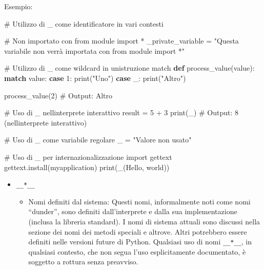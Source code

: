 \documentclass[
  letterpaper,
]{scrbook}
\newenvironment{Shaded}{\begin{snugshade}}{\end{snugshade}}
\newcommand{\BuiltInTok}[1]{\textcolor[rgb]{0.00,0.23,0.31}{#1}}
\newcommand{\CommentTok}[1]{\textcolor[rgb]{0.37,0.37,0.37}{#1}}
\newcommand{\ControlFlowTok}[1]{\textcolor[rgb]{0.00,0.23,0.31}{\textbf{#1}}}
\newcommand{\DecValTok}[1]{\textcolor[rgb]{0.68,0.00,0.00}{#1}}
\newcommand{\ImportTok}[1]{\textcolor[rgb]{0.00,0.46,0.62}{#1}}
\newcommand{\KeywordTok}[1]{\textcolor[rgb]{0.00,0.23,0.31}{\textbf{#1}}}
\newcommand{\NormalTok}[1]{\textcolor[rgb]{0.00,0.23,0.31}{#1}}
\newcommand{\OperatorTok}[1]{\textcolor[rgb]{0.37,0.37,0.37}{#1}}
\newcommand{\StringTok}[1]{\textcolor[rgb]{0.13,0.47,0.30}{#1}}
\providecommand{\tightlist}{%
  \setlength{\itemsep}{0pt}\setlength{\parskip}{0pt}}\usepackage{longtable,booktabs,array}
\begin{document}
Esempio:

\begin{Shaded}
\begin{Highlighting}[]
\CommentTok{\# Utilizzo di \_ come identificatore in vari contesti}

\CommentTok{\# Non importato con from module import *}
\NormalTok{\_private\_variable }\OperatorTok{=} \StringTok{"Questa variabile non verrà importata con \textquotesingle{}from module import *\textquotesingle{}"}

\CommentTok{\# Utilizzo di \_ come wildcard in un\textquotesingle{}istruzione match}
\KeywordTok{def}\NormalTok{ process\_value(value):}
    \ControlFlowTok{match}\NormalTok{ value:}
        \ControlFlowTok{case} \DecValTok{1}\NormalTok{:}
            \BuiltInTok{print}\NormalTok{(}\StringTok{"Uno"}\NormalTok{)}
        \ControlFlowTok{case}\NormalTok{ \_:}
            \BuiltInTok{print}\NormalTok{(}\StringTok{"Altro"}\NormalTok{)}

\NormalTok{process\_value(}\DecValTok{2}\NormalTok{)  }\CommentTok{\# Output: Altro}

\CommentTok{\# Uso di \_ nell\textquotesingle{}interprete interattivo}
\NormalTok{result }\OperatorTok{=} \DecValTok{5} \OperatorTok{+} \DecValTok{3}
\BuiltInTok{print}\NormalTok{(\_)  }\CommentTok{\# Output: 8 (nell\textquotesingle{}interprete interattivo)}

\CommentTok{\# Uso di \_ come variabile regolare}
\NormalTok{\_ }\OperatorTok{=} \StringTok{"Valore non usato"}

\CommentTok{\# Uso di \_ per internazionalizzazione}
\ImportTok{import}\NormalTok{ gettext}
\NormalTok{gettext.install(}\StringTok{\textquotesingle{}myapplication\textquotesingle{}}\NormalTok{)}
\BuiltInTok{print}\NormalTok{(\_(}\StringTok{\textquotesingle{}Hello, world\textquotesingle{}}\NormalTok{))}
\end{Highlighting}
\end{Shaded}

\begin{itemize}
\tightlist
\item
  \texttt{\_\_*\_\_}

  \begin{itemize}
  \tightlist
  \item
    Nomi definiti dal sistema: Questi nomi, informalmente noti come nomi
    ``dunder'', sono definiti dall'interprete e dalla sua
    implementazione (inclusa la libreria standard). I nomi di sistema
    attuali sono discussi nella sezione dei nomi dei metodi speciali e
    altrove. Altri potrebbero essere definiti nelle versioni future di
    Python. Qualsiasi uso di nomi \texttt{\_\_*\_\_}, in qualsiasi
    contesto, che non segua l'uso esplicitamente documentato, è soggetto
    a rottura senza preavviso.
  \end{itemize}
\end{itemize}
\end{document}
